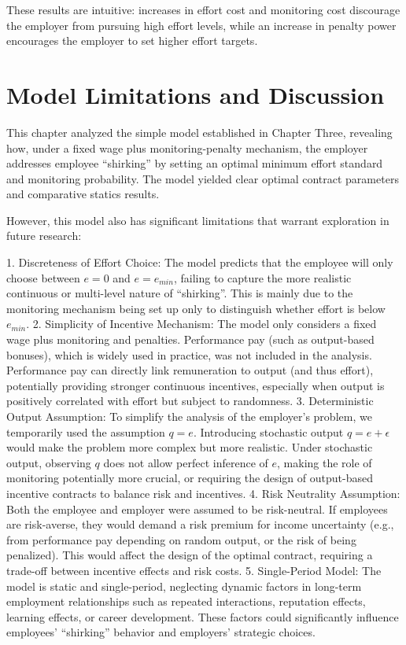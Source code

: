 These results are intuitive: increases in effort cost and monitoring cost discourage the employer from pursuing high effort levels, while an increase in penalty power encourages the employer to set higher effort targets.

\section{Model Limitations and Discussion}
\label{sec:discussion_limitations}

This chapter analyzed the simple model established in Chapter Three, revealing how, under a fixed wage plus monitoring-penalty mechanism, the employer addresses employee \enquote{shirking} by setting an optimal minimum effort standard and monitoring probability. The model yielded clear optimal contract parameters and comparative statics results.

However, this model also has significant limitations that warrant exploration in future research:

1.  {Discreteness of Effort Choice}: The model predicts that the employee will only choose between $e=0$ and $e=e_{min}$, failing to capture the more realistic continuous or multi-level nature of \enquote{shirking}. This is mainly due to the monitoring mechanism being set up only to distinguish whether effort is below $e_{min}$.
2.  {Simplicity of Incentive Mechanism}: The model only considers a fixed wage plus monitoring and penalties. Performance pay (such as output-based bonuses), which is widely used in practice, was not included in the analysis. Performance pay can directly link remuneration to output (and thus effort), potentially providing stronger continuous incentives, especially when output is positively correlated with effort but subject to randomness.
3.  {Deterministic Output Assumption}: To simplify the analysis of the employer's problem, we temporarily used the assumption $q=e$. Introducing stochastic output $q = e + \epsilon$ would make the problem more complex but more realistic. Under stochastic output, observing $q$ does not allow perfect inference of $e$, making the role of monitoring potentially more crucial, or requiring the design of output-based incentive contracts to balance risk and incentives.
4.  {Risk Neutrality Assumption}: Both the employee and employer were assumed to be risk-neutral. If employees are risk-averse, they would demand a risk premium for income uncertainty (e.g., from performance pay depending on random output, or the risk of being penalized). This would affect the design of the optimal contract, requiring a trade-off between incentive effects and risk costs.
5.  {Single-Period Model}: The model is static and single-period, neglecting dynamic factors in long-term employment relationships such as repeated interactions, reputation effects, learning effects, or career development. These factors could significantly influence employees' \enquote{shirking} behavior and employers' strategic choices.

